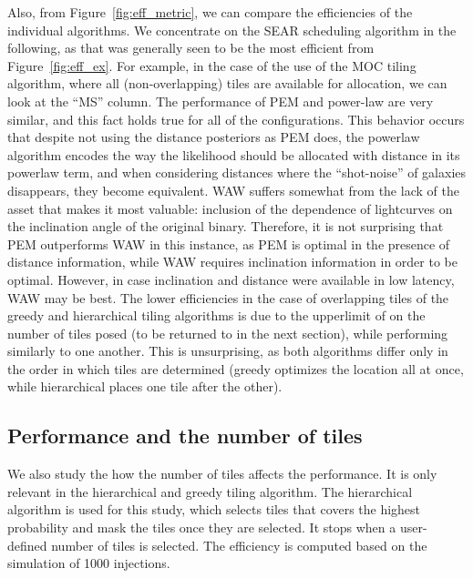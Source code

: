 \documentclass[twocolumn]{aastex62}
\begin{document}
Also, from Figure~\ref{fig:eff_metric}, we can compare the efficiencies of the individual algorithms.
We concentrate on the SEAR scheduling algorithm in the following, as that was generally seen to be the most efficient from Figure~\ref{fig:eff_ex}. For example, in the case of the use of the MOC tiling algorithm, where all (non-overlapping) tiles are available for allocation, we can look at the ``MS'' column. The performance of PEM and power-law are very similar, and this fact holds true for all of the configurations. This behavior occurs that despite not using the distance posteriors as PEM does, the powerlaw algorithm encodes the way the likelihood should be allocated with distance in its powerlaw term, and when considering distances where the ``shot-noise'' of galaxies disappears, they become equivalent. WAW suffers somewhat from the lack of the asset that makes it most valuable: inclusion of the dependence of lightcurves on the inclination angle of the original binary. Therefore, it is not surprising that PEM outperforms WAW in this instance, as PEM is optimal in the presence of distance information, while WAW requires inclination information in order to be optimal. However, in case inclination and distance were available in low latency, WAW may be best.
The lower efficiencies in the case of overlapping tiles of the greedy and hierarchical tiling algorithms is due to the upperlimit of on the number of tiles posed (to be returned to in the next section), while performing similarly to one another. This is unsurprising, as both algorithms differ only in the order in which tiles are determined (greedy optimizes the location all at once, while hierarchical places one tile after the other).

\subsection{Performance and the number of tiles}
We also study the how the number of tiles affects the performance. It is only relevant in the hierarchical and greedy tiling algorithm. The hierarchical algorithm is used for this study, which selects tiles that covers the highest probability and mask the tiles once they are selected. It stops when a user-defined number of tiles is selected. The efficiency is computed based on the simulation of 1000 injections.
\end{document}
